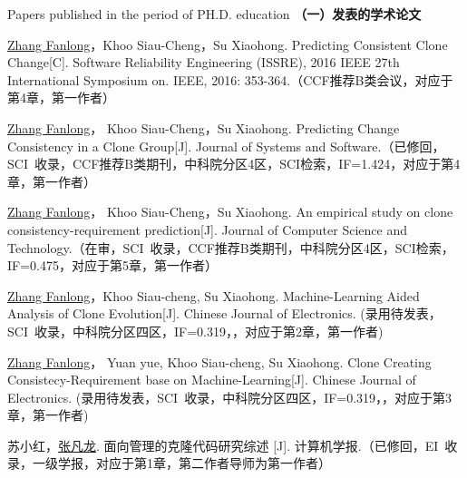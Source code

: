 
 {Papers
published in the period of PH.D. education}
\noindent\textbf{（一）发表的学术论文}
\begin{publist}
\item
\underline{Zhang Fanlong}，Khoo Siau-Cheng，Su Xiaohong. Predicting Consistent Clone Change[C]. Software Reliability Engineering (ISSRE), 2016 IEEE 27th International Symposium on. IEEE, 2016: 353-364.（CCF推荐B类会议，对应于第4章，第一作者）
\item
\underline{Zhang Fanlong}， Khoo Siau-Cheng，Su Xiaohong. Predicting Change Consistency in a Clone Group[J]. Journal of Systems and Software.（已修回，SCI~收录，CCF推荐B类期刊，中科院分区4区，SCI检索，IF=1.424，对应于第4章，第一作者）
\item
\underline{Zhang Fanlong}， Khoo Siau-Cheng，Su Xiaohong. An empirical study on clone consistency-requirement prediction[J]. Journal of Computer Science and Technology.（在审，SCI~收录，CCF推荐B类期刊，中科院分区4区，SCI检索，IF=0.475，对应于第5章，第一作者）
\item
\underline{Zhang Fanlong}，Khoo Siau-cheng, Su Xiaohong. Machine-Learning Aided Analysis of Clone Evolution[J]. Chinese Journal of Electronics. (录用待发表，SCI~收录，中科院分区四区，IF=0.319，，对应于第2章，第一作者)
\item
\underline{Zhang Fanlong}， Yuan yue, Khoo Siau-cheng, Su Xiaohong. Clone Creating Consistecy-Requirement base on Machine-Learning[J]. Chinese Journal of Electronics. (录用待发表，SCI~收录，中科院分区四区，IF=0.319，，对应于第3章，第一作者)
\item 
苏小红，\underline{张凡龙}. 面向管理的克隆代码研究综述 [J]. 计算机学报.（已修回，EI~收录，一级学报，对应于第1章，第二作者导师为第一作者）



\end{publist}
